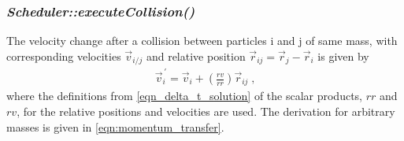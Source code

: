 \subsubsection{\quad \textit{Scheduler::executeCollision()}}
The velocity change after a collision between particles i and j of same mass, with corresponding velocities $\vec{v}_{i/j}$ and relative position $\vec{r}_{ij} = \vec{r}_{j} -\vec{r}_{i}$ is given by   
\begin{align}
\label{eqn:collision_result}
\vec{v}_i^{\,'} = \vec{v}_i + \left( \frac{rv}{rr} \right) \vec{r}_{ij} \; \text{,}
\end{align}
where the definitions from \autoref{eqn_delta_t_solution} of the scalar products, $rr$ and $rv$, for the relative positions and velocities are used. The derivation for arbitrary masses is given in \autoref{eqn:momentum_transfer}.\\
 
